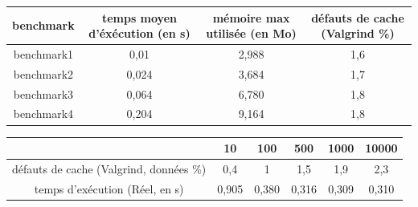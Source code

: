 \documentclass[paper=a4, fontsize=11pt]{scrartcl} %
\begin{document}
\begin{tabular}{ | c | c | c | c |}
    \hline
        benchmark& temps moyen d'éxécution (en s)& mémoire max utilisée (en Mo) & défauts de cache (Valgrind \%)\\ \hline\hline
        benchmark1 & 0,01 & 2,988 & 1,6\\ \hline
        benchmark2 & 0,024 & 3,684 & 1,7\\ \hline
        benchmark3 & 0,064 & 6,780 & 1,8\\ \hline
        benchmark4 & 0,204 & 9,164 & 1,8\\
    \hline
 \end{tabular}


\begin{tabular}{ | c | c | c | c | c | c | }
 \hline
     & 10 & 100 & 500 & 1000 & 10000\\ \hline
     défauts de cache (Valgrind, données \%) & 0,4 & 1 & 1,5 & 1,9 & 2,3\\ \hline
     temps d'exécution (Réel, en s) & 0,905 & 0,380 & 0,316 & 0,309 & 0,310\\
 \hline
\end{tabular}
\end{document}
